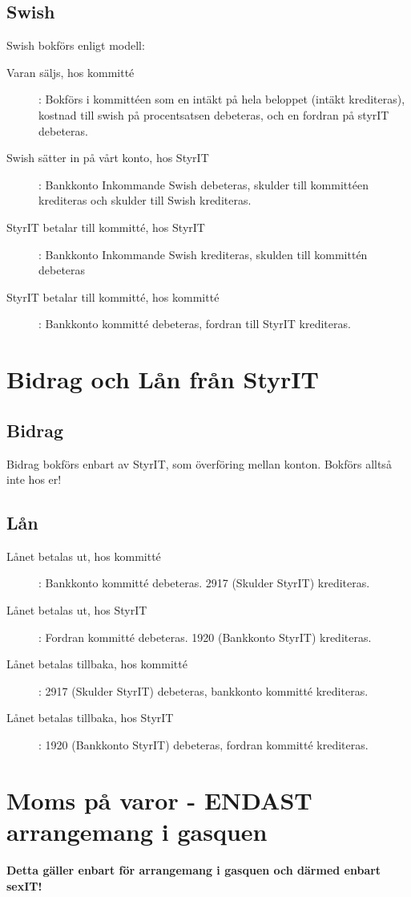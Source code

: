 \documentclass{article}
\begin{document}
\subsection{Swish}
Swish bokförs enligt modell: 
\begin{description}
    \item [Varan säljs, hos kommitté]: Bokförs i kommittéen som en intäkt på hela beloppet (intäkt krediteras), kostnad till swish på procentsatsen debeteras, och en fordran på styrIT debeteras. 
    \item [Swish sätter in på vårt konto, hos StyrIT]: Bankkonto Inkommande Swish debeteras, skulder till kommittéen krediteras och skulder till Swish krediteras. 
    \item [StyrIT betalar till kommitté, hos StyrIT]: Bankkonto Inkommande Swish krediteras, skulden till kommittén debeteras
    \item [StyrIT betalar till kommitté, hos kommitté]: Bankkonto kommitté debeteras, fordran till StyrIT krediteras.
\end{description}

\section{Bidrag och Lån från StyrIT}
\subsection{Bidrag}
Bidrag bokförs enbart av StyrIT, som överföring mellan konton. Bokförs alltså inte hos er! 
\subsection{Lån}
\begin{description}
    \item [Lånet betalas ut, hos kommitté]: Bankkonto kommitté debeteras. 2917 (Skulder StyrIT) krediteras. 
    \item [Lånet betalas ut, hos StyrIT]: Fordran kommitté debeteras. 1920 (Bankkonto StyrIT) krediteras.
    \item [Lånet betalas tillbaka, hos kommitté]: 2917 (Skulder StyrIT) debeteras, bankkonto kommitté krediteras.
    \item [Lånet betalas tillbaka, hos StyrIT]: 1920 (Bankkonto StyrIT) debeteras, fordran kommitté krediteras.
\end{description}

\section{Moms på varor - ENDAST arrangemang i gasquen}
\textbf{Detta gäller enbart för arrangemang i gasquen och därmed enbart sexIT!}
\end{document}
